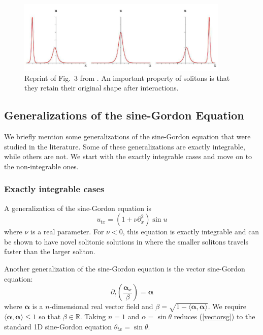\documentclass{report}
\begin{document}
\begin{figure}\centering
  \includegraphics[width=0.9\textwidth]{plot/soliton-interaction.png}
  \caption{Reprint of Fig.~3 from \cite{2011PhyD..240.1378A}. An important property of solitons is that they retain their original shape after interactions.}
  \label{interaction}
\end{figure}

\subsection{Generalizations of the sine-Gordon Equation}
We briefly mention some generalizations of the sine-Gordon equation that were studied in the literature. Some of these generalizations are exactly integrable, while others are not. We start with the exactly integrable cases and move on to the non-integrable ones.

\subsubsection{Exactly integrable cases}
A generalization of the sine-Gordon equation is \cite{1751-8121-43-10-105204}
\begin{equation}
  u_{tx} = (1+\nu \partial^2_x)\sin u
\end{equation}
where $\nu$ is a real parameter. For $\nu<0$, this equation is exactly integrable and can be shown to have novel solitonic solutions in \cite{1751-8121-43-10-105204} where the smaller solitons travels faster than the larger soliton.

\medbreak
Another  generalization of the sine-Gordon equation is the vector sine-Gordon equation:
\begin{equation}\label{vectorsg}
  \partial_t\left(\frac{\bm{\alpha}_x}{\beta}\right) = \bm{\alpha}
\end{equation}
where $\bm{\alpha}$ is a $n$-dimensional real vector field and $\beta = \sqrt{1 - \langle\bm{\alpha},\bm{\alpha}\rangle}$. We require $\langle\bm{\alpha},\bm{\alpha}\rangle\le1$ so that $\beta\in\mathbb{R}$. Taking $n=1$ and $\alpha = \sin \theta$ reduces (\ref{vectorsg}) to the standard 1D sine-Gordon equation $\theta_{tx} = \sin \theta$.
\end{document}
